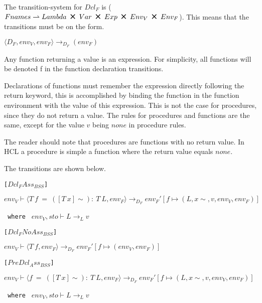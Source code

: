 The transition-system for $Dcl_F$ is ($Fnames \rightharpoonup Lambda\ \Cross\ Var\ \Cross\ Exp\ \Cross\ Env_V\ \Cross\ Env_F$).
This means that the transitions must be on the form.

\begin{center}
	$\langle D_F, env_V, env_F \rangle \rightarrow_{D_F} (env_F)$
\end{center}

Any function returning a value is an expression.
For simplicity, all functions will be denoted f in the function declaration transitions.

Declarations of functions must remember the expression directly following the return keyword, this is accomplished by binding the function in the function environment with the value of this expression.
This is not the case for procedures, since they do not return a value.
The rules for procedures and functions are the same, except for the value $v$ being $none$ in procedure rules.

The reader should note that procedures are functions with no return value.
In HCL a procedure is simple a function where the return value equals $none$.

The transitions are shown below.

\texttt{[$Dcl_FAss_{BSS}$]}\\
\begin{center}
	\begin{math}
			{env_V \vdash \langle T\ f\ =\ ([T\ x]\sim):\ T\ L,env_F \rangle \rightarrow_{D_F} env_F'[f \mapsto (L, x\sim, v, env_V, env_F)]}
	\end{math}
	
	\texttt{ where } $env_V, sto \vdash L \rightarrow_L v$
\end{center}

\texttt{[$Dcl_FNoAss_{BSS}$]}\\
\begin{center}
	\begin{math}
	{env_V \vdash \langle T\ f,env_F \rangle \rightarrow_{D_F} env_F'[f \mapsto (env_V, env_F)]}
	\end{math}
\end{center}

\texttt{[$PreDcl_Ass_{BSS}$]}\\
\begin{center}
	\begin{math}
	{env_V \vdash \langle f\ =\ ([T\ x]\sim):\ T\ L,env_F \rangle \rightarrow_{D_F} env_F'[f \mapsto (L, x\sim, v, env_V, env_F)]}
	\end{math}
	
	\texttt{ where } $env_V, sto \vdash L \rightarrow_L v$
\end{center}


